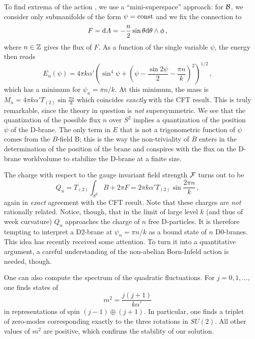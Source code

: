 \documentclass[a4paper,12pt]{article} \usepackage{amssymb,amsfonts,latexsym}
\begin{document}
To find extrema of the action , we use a ``mini-superspace''
approach: for ${\cal B}$, we consider only submanifolds of the form 
$\psi={\rm const}$ and we fix the connection to 
$$ F = {\rm d} A = -\frac n2 \sin\theta {\rm d}\theta\wedge \rm\phi \,, $$
where $n\in{\mathbb Z}$ gives the flux of $F$.
As a function of the single variable $\psi$, the energy then reads
$$ E_n(\psi) = 4\pi k\alpha' (\sin^4\psi + (\psi-\frac{\sin2\psi}2 - 
\frac{\pi n}k)^2)^{1/2} \, , $$
which has a minimum for $\psi_n= \pi n/ k$. At this minimum, the mass
is $M_n=4\pi k\alpha'T_{(2)}\sin\frac{\pi n}k$ which coincides {\em exactly}
with the CFT result. This is truly remarkable, since the theory in question
is {\em not} supersymmetric. We see that the quantization
of the possible flux $n$ over $S^2$ implies a quantization of the position
$\psi$ of the D-brane. The only term in $E$ that is not a trigonometric 
function of $\psi$ comes from the $B$-field \erf B; this is the way the
non-triviality of $B$ enters in the determination of the position of the
brane and conspires with the flux on the D-brane worldvolume to stabilize
the D-brane at a finite size.

The charge with respect to the gauge invariant field strength ${\cal F}$ turns
out to be 
$$ Q_n = T_{(2)} \int_{S^2} B + 2\pi F = 2\pi k \alpha' T_{(2)}
\sin\frac{2\pi n}k \, , $$
again in {\em exact} agreement with the CFT result.
Note that these charges are {\em not} rationally related. Notice, though,
that in the limit of large level $k$ (and thus of week curvature)
$Q_n$ approaches the charge of $n$ free D-particles. It is therefore
tempting to interpret a D2-brane at $\psi_n= \pi n/k$ as a bound state of 
$n$ D0-branes. This idea has recently received some attention. To turn it into
a quantitative argument, a careful understanding of the non-abelian Born-Infeld
action \cite{myer} is needed, though.

One can also compute the spectrum of the quadratic fluctuations. For 
$j=0,1,\ldots$, one finds states of
$$ m^2 = \frac{j(j+1)}{k\alpha'} $$
in representations of spin $(j-1)\oplus(j+1)$. In particular, one finds
a triplet of zero-modes corresponding exactly to the three rotations in $SU(2)$.
All other values of $m^2$ are positive, which confirms the stability of our 
solution.
\end{document}
